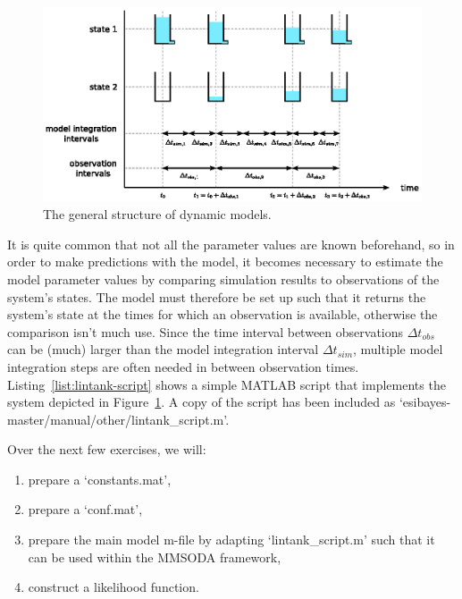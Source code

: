 \begin{figure}[htb]
  \centering
    \includegraphics[width=\linewidth,keepaspectratio]{./../eps/states-and-flows.eps}
  \caption{The general structure of dynamic models.}
  \label{fig:states-and-flows}
\end{figure}

It is quite common that not all the parameter values are known beforehand, so in order to make predictions with the model, it becomes necessary to estimate the model parameter values by comparing simulation results to observations of the system's states. The model must therefore be set up such that it returns the system's state at the times for which an observation is available, otherwise the comparison isn't much use. Since the time interval between observations $\Delta{}t_{obs}$ can be (much) larger than the model integration interval $\Delta{}t_{sim}$, multiple model integration steps are often needed in between observation times. Listing~\ref{list:lintank-script} shows a simple MATLAB script that implements the system depicted in Figure~\ref{fig:states-and-flows}.  A copy of the script has been included as `esibayes-master/manual/other/lintank\_script.m'.


Over the next few exercises, we will:
\begin{enumerate}
\item{prepare a `constants.mat',}
\item{prepare a `conf.mat',}
\item{prepare the main model m-file by adapting `lintank\_script.m' such that it can be used within the MMSODA framework,}
\item{construct a likelihood function.}
\end{enumerate}


